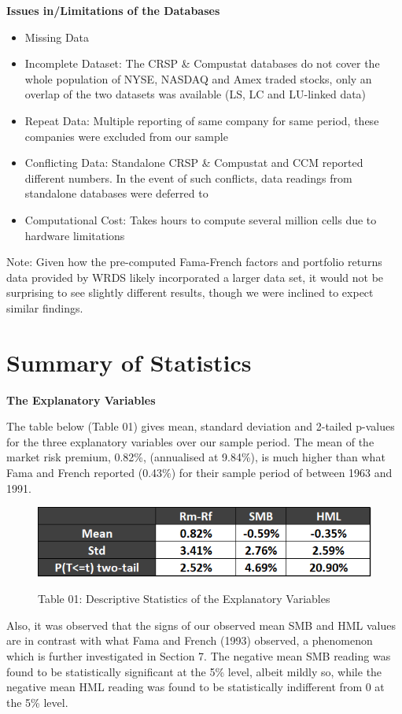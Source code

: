 \documentclass[12pt]{article}
\begin{document}
\noindent \textbf{Issues in/Limitations of the Databases}
\begin{itemize}
	\item Missing Data
	\item Incomplete Dataset: The CRSP \& Compustat databases do not cover the whole population of NYSE, NASDAQ and Amex traded stocks, only an overlap of the two datasets was available (LS, LC and LU-linked data)
	\item Repeat Data: Multiple reporting of same company for same period, these companies were excluded from our sample
	\item Conflicting Data: Standalone CRSP \& Compustat and CCM reported different numbers. In the event of such conflicts, data readings from standalone databases were deferred to
	\item Computational Cost: Takes hours to compute several million cells due to hardware limitations
\end{itemize}
\noindent Note: Given how the pre-computed Fama-French factors and portfolio returns data provided by WRDS likely incorporated a larger data set, it would not be surprising to see slightly different results, though we were inclined to expect similar findings. 

\newpage

\section{Summary of Statistics}
\textbf{The Explanatory Variables}

\noindent The table below (Table 01) gives mean, standard deviation and 2-tailed p-values for the three explanatory variables over our sample period. The mean of the market risk premium, 0.82\%, (annualised at 9.84\%), is much higher than what Fama and French reported (0.43\%) for their sample period of between 1963 and 1991. 


\begin{figure}[h]
	\centering
	\caption*{Table 01: Descriptive Statistics of the Explanatory Variables}
	\includegraphics[width=0.45\linewidth]{A1.png}
	\label{fig:label}
\end{figure}

\noindent Also, it was observed that the signs of our observed mean SMB and HML values are in contrast with what Fama and French (1993) observed, a phenomenon which is further investigated in Section 7. The negative mean SMB reading was found to be statistically significant at the 5\% level, albeit mildly so, while the negative  mean HML reading was found to be statistically indifferent from 0 at the 5\% level. \\
\end{document}
